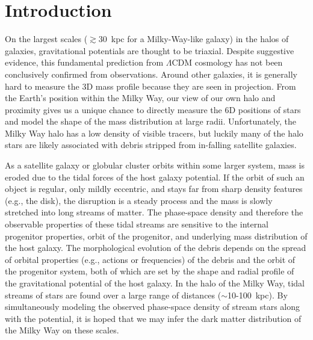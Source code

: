 \documentclass[letterpaper,12pt,preprint]{aastex}
\begin{document}
\keywords{
}


\section{Introduction}\label{sec:introduction}

On the largest scales ($\gtrsim$30~kpc for a Milky-Way-like galaxy) in the halos of galaxies, gravitational potentials are thought to be triaxial. Despite suggestive evidence, this fundamental prediction from $\Lambda$CDM cosmology has not been conclusively confirmed from observations. Around other galaxies, it is generally hard to measure the 3D mass profile because they are seen in projection. From the Earth's position within the Milky Way, our view of our own halo and proximity gives us a unique chance to directly measure the 6D positions of stars and model the shape of the mass distribution at large radii. Unfortunately, the Milky Way halo has a low density of visible tracers, but luckily many of the halo stars are likely associated with debris stripped from in-falling satellite galaxies.

As a satellite galaxy or globular cluster orbits within some larger system, mass is eroded due to the tidal forces of the host galaxy potential. If the orbit of such an object is regular, only mildly eccentric, and stays far from sharp density features (e.g., the disk), the disruption is a steady process and the mass is slowly stretched into long streams of matter. The phase-space density and therefore the observable properties of these tidal streams are sensitive to the internal progenitor properties, orbit of the progenitor, and underlying mass distribution of the host galaxy. The morphological evolution of the debris depends on the spread of orbital properties (e.g., actions or frequencies) of the debris and the orbit of the progenitor system, both of which are set by the shape and radial profile of the gravitational potential of the host galaxy. In the halo of the Milky Way, tidal streams of stars are found over a large range of distances ($\sim$10-100~kpc). By simultaneously modeling the observed phase-space density of stream stars along with the potential, it is hoped that we may infer the dark matter distribution of the Milky Way on these scales.
\end{document}
